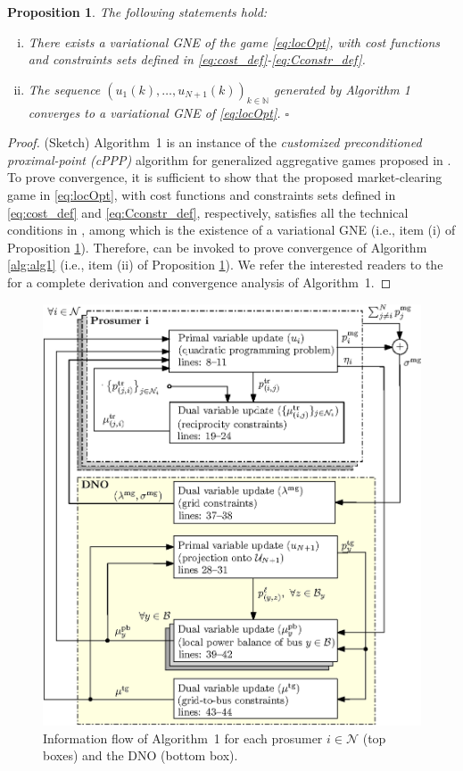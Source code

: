 \documentclass{IEEEtran}  %
\newtheorem{proposition}{Proposition}
\newcommand{\mc}{\mathcal}
\newcommand{\bb}{\mathbb}
\newcommand{\0}{\mathbf{0}}
\newcommand{\1}{\mathbf{1}}
\begin{document}
\smallskip
\begin{proposition}
	\label{prp:conv}
The following statements hold:
\begin{enumerate}[(i)]
\item There exists a variational GNE of the game \eqref{eq:locOpt}, with cost functions and constraints sets defined in \eqref{eq:cost_def}-\eqref{eq:Cconstr_def}.
\item The sequence $\left(u_1(k),\ldots,u_{N+1}(k)\right)_{k \in \bb N}$ generated by Algorithm 1 converges to a variational GNE of \eqref{eq:locOpt}.
{\hfill $\square$ }
\end{enumerate}
\end{proposition}
\begin{proof} (Sketch)
Algorithm~1 is an instance of the \textit{customized preconditioned proximal-point (cPPP)} algorithm for generalized aggregative games proposed in \cite[Algorithm~6]{belgioioso2020semi}. To prove convergence, it is sufficient to show that the proposed market-clearing game in \eqref{eq:locOpt}, with cost functions and constraints sets defined in \eqref{eq:cost_def} and \eqref{eq:Cconstr_def}, respectively, satisfies all the technical conditions in \cite[Theorem~2]{belgioioso2020semi}, among which is the existence of a variational GNE (i.e., item (i) of Proposition \ref{prp:conv}). Therefore, \cite[Theorem~2]{belgioioso2020semi} can be invoked to prove convergence of Algorithm \ref{alg:alg1} (i.e., item (ii) of Proposition \ref{prp:conv}).
We refer the interested readers to the \cite[Appendix~A]{belgioioso2021operationally} for a complete derivation and convergence analysis of Algorithm~1.
\end{proof}

\begin{figure}[t]
\centering
\includegraphics[width=.5\textwidth]{figures/algorithm1_GB_v4}
\caption{Information flow of Algorithm~1 for each prosumer $i \in \mc N$ (top boxes) and the DNO (bottom box).}
\label{fig:IFC}
\end{figure}
\end{document}
